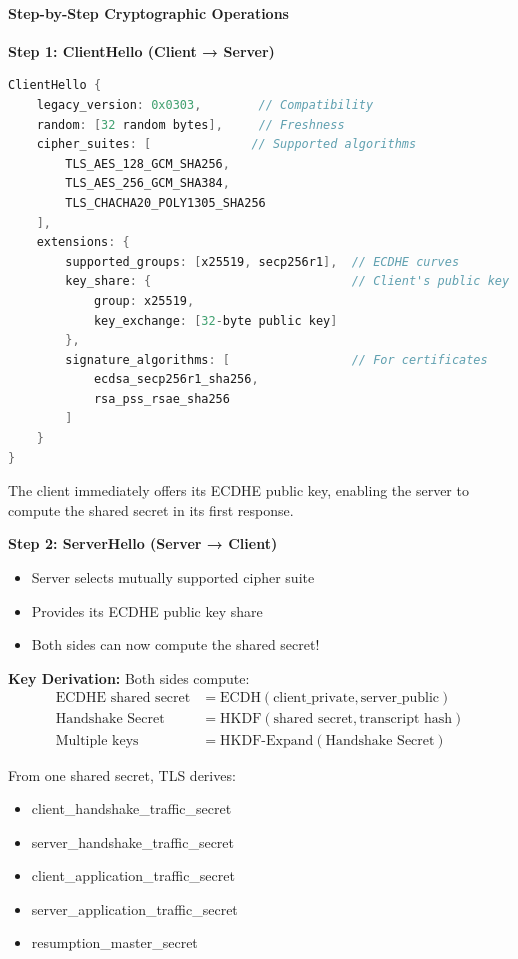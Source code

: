 \documentclass[11pt,a4paper]{article}
\begin{document}
\paragraph{Step-by-Step Cryptographic Operations}

\textbf{Step 1: ClientHello (Client → Server)}
\begin{lstlisting}[language=C, caption=ClientHello Contents]
ClientHello {
    legacy_version: 0x0303,        // Compatibility
    random: [32 random bytes],     // Freshness
    cipher_suites: [              // Supported algorithms
        TLS_AES_128_GCM_SHA256,
        TLS_AES_256_GCM_SHA384,
        TLS_CHACHA20_POLY1305_SHA256
    ],
    extensions: {
        supported_groups: [x25519, secp256r1],  // ECDHE curves
        key_share: {                            // Client's public key
            group: x25519,
            key_exchange: [32-byte public key]
        },
        signature_algorithms: [                 // For certificates
            ecdsa_secp256r1_sha256,
            rsa_pss_rsae_sha256
        ]
    }
}
\end{lstlisting}

The client immediately offers its ECDHE public key, enabling the server to compute the shared secret in its first response.

\textbf{Step 2: ServerHello (Server → Client)}
\begin{itemize}
    \item Server selects mutually supported cipher suite
    \item Provides its ECDHE public key share
    \item Both sides can now compute the shared secret!
\end{itemize}

\textbf{Key Derivation:} Both sides compute:
\begin{align}
\text{ECDHE shared secret} &= \text{ECDH}(\text{client\_private}, \text{server\_public})\\
\text{Handshake Secret} &= \text{HKDF}(\text{shared secret}, \text{transcript hash})\\
\text{Multiple keys} &= \text{HKDF-Expand}(\text{Handshake Secret})
\end{align}

From one shared secret, TLS derives:
\begin{itemize}
    \item client\_handshake\_traffic\_secret
    \item server\_handshake\_traffic\_secret
    \item client\_application\_traffic\_secret
    \item server\_application\_traffic\_secret
    \item resumption\_master\_secret
\end{itemize}
\end{document}

